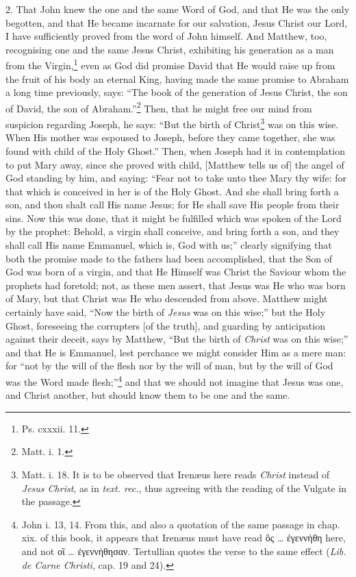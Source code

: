 2. That John knew the one and the same Word of God, and that He was the only begotten, and that He became incarnate for our salvation, Jesus Christ our Lord, I have sufficiently proved from the word of John himself. And Matthew, too, recognising one and the same Jesus Christ, exhibiting his generation as a man from the Virgin,\footnote{Ps. cxxxii. 11.} even as God did promise David that He would raise up from the fruit of his body an eternal King, having made the same promise to Abraham a long time previously, says: “The book of the generation of Jesus Christ, the son of David, the son of Abraham.”\footnote{Matt. i. 1.} Then, that he might free our mind from suspicion regarding Joseph, he says: “But the birth of Christ\footnote{Matt. i. 18. It is to be observed that Irenæus here reads \emph{Christ} instead of \emph{Jesus Christ}, as in \emph{text. rec.}, thus agreeing with the reading of the Vulgate in the passage.} was on this  wise. When His mother was espoused to Joseph, before they came together, she was found with child of the Holy Ghost.” Then, when Joseph had it in contemplation to put Mary away, since she proved with child, [Matthew tells us of] the angel of God standing by him, and saying: “Fear not to take unto thee Mary thy wife: for that which is conceived in her is of the Holy Ghost. And she shall bring forth a son, and thou shalt call His name Jesus; for He shall save His people from their sins. Now this was done, that it might be fulfilled which was spoken of the Lord by the prophet: Behold, a virgin shall conceive, and bring forth a son, and they shall call His name Emmanuel, which is, God with us;” clearly signifying that both the promise made to the fathers had been accomplished, that the Son of God was born of a virgin, and that He Himself was Christ the Saviour whom the prophets had foretold; not, as these men assert, that Jesus was He who was born of Mary, but that Christ was He who descended from above. Matthew might certainly have said, “Now the birth of \emph{Jesus} was on this wise;” but the Holy Ghost, foreseeing the corrupters [of the truth], and guarding by anticipation against their deceit, says by Matthew, “But the birth of \emph{Christ} was on this wise;” and that He is Emmanuel, lest perchance we might consider Him as a mere man: for “not by the will of the flesh nor by the will of man, but by the will of God was the Word made flesh;”\footnote{John i. 13, 14. From this, and also a quotation of the same passage in chap. xix. of this book, it appears that Irenæus must have read \textgreek{ὃς} … \textgreek{ἐγεννήθη} here, and not \textgreek{οἳ} … \textgreek{ἐγεννήθησαν}. Tertullian quotes the verse to the same effect (\emph{Lib. de Carne Christi}, cap. 19 and 24).} and that we should not imagine that Jesus was one, and Christ another, but should know them to be one and the same.

